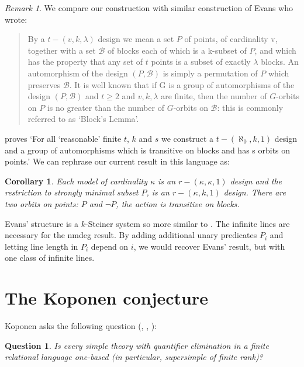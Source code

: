 \documentclass[11pt]{amsart}
\def\BB{\mathcal{B}}
\newtheorem{question}[theorem]{Question}
\newtheorem{cor}[theorem]{Corollary}
\theoremstyle{definition}
\theoremstyle{remark}
\newtheorem{remark}[theorem]{Remark}
\numberwithin{equation}{section}
\begin{document}
\begin{remark}
We compare our construction with similar construction of Evans
\cite{Evansblock} who wrote:

\begin{quote}
 By a $t-(v, k,\lambda)$ design we mean a set $P$ of points, of cardinality
v, together with a set $\BB$ of blocks each of which is a k-subset of $P$,
and which has the property that any set of $t$ points is a subset of exactly
$\lambda$ blocks. An automorphism of the design $(P, \BB)$ is simply a
permutation of $P$ which preserves $\BB$. It is well known 
that if G is a group of automorphisms of the design $(P, \BB)$ and $t \geq 2$
and $v, k, \lambda$ are finite, then the number of $G$-orbits on $P$ is no
greater than the number of $G$-orbits on $\BB$: this is commonly referred to
as `Block’s Lemma'.
\end{quote}
\end{remark}


\cite{Evansblock} proves `For all ‘reasonable’ finite $t$, $k$ and $s$ we construct
a $t-(\aleph_0, k, 1)$ design and a group of automorphisms which is
transitive on blocks and has s orbits on points.' We can rephrase our current
result in this language as:

\begin{cor}

 Each model of cardinality
$\kappa$ is an $r-(\kappa,\kappa,1)$ design and the restriction to strongly
minimal subset $P$, is an $r-(\kappa,k,1)$ design. There are two orbits on
points: $P$ and $\neg P$, the action is transitive on blocks.
\end{cor}

Evans' structure  is a $k$-Steiner system so more similar to
\cite{BaldwinPao}. The infinite lines are necessary for the nmdeg result. By
adding additional unary predicates $P_i$  and letting line length in $P_i$
depend on $i$, we would recover Evans' result, but with one class of infinite
lines.



\section{The Koponen conjecture} \label{Kop}
 \setcounter{theorem}{0}
Koponen asks the following question (\cite{Kop16}, \cite{Kop19}, \cite{Kop16slides}): 

\begin{question}
   Is every simple theory with quantifier elimination in a finite relational language one-based (in particular, supersimple of finite rank)?
\end{question}
\end{document}
